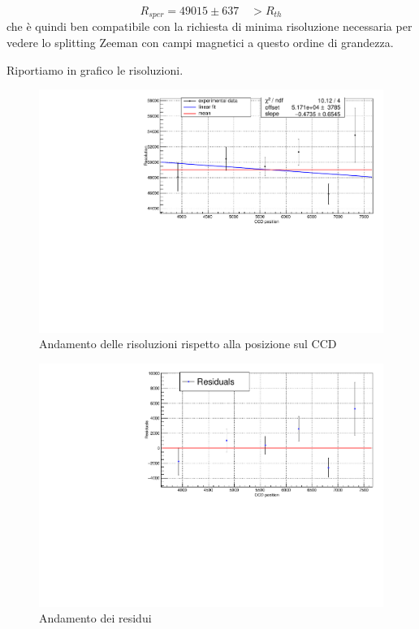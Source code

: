 \documentclass{article}
\begin{document}
	\[
		R_{sper} = 49015 \pm 637	\quad > R_{th}	
	\]
	che è quindi ben compatibile con la richiesta di minima risoluzione
	necessaria per vedere lo splitting Zeeman con campi magnetici a questo 
	ordine di grandezza.

	Riportiamo in grafico le risoluzioni.

	\begin{center}
		\begin{figure}[H]
			\centering
			\includegraphics[scale=0.38, angle=0]{campospento/ris.pdf}
			\caption{Andamento delle risoluzioni rispetto alla posizione sul CCD}
			\label{fig:deltaxruBoff}
		\end{figure}
	\end{center}

	\begin{center}
		\begin{figure}[H]
			\centering
			\includegraphics[scale=0.38, angle=0]{campospento/resris.pdf}
			\caption{Andamento dei residui}
			\label{fig:deltaxruBoffres}
		\end{figure}
	\end{center}
\end{document}
